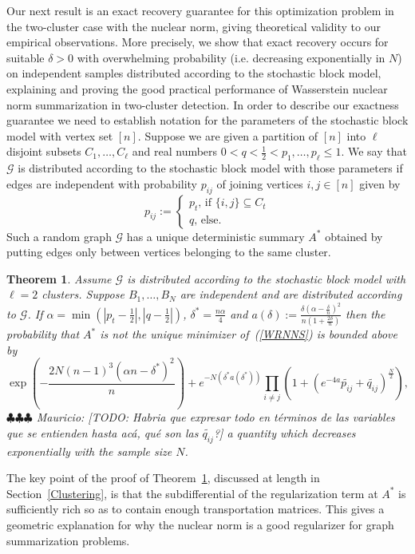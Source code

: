 \documentclass[12pt]{amsart}
\newtheorem{theorem}[lemma]{Theorem}
\theoremstyle{remark}
\newcommand{\grG}{{\mathcal{G}}}
\newcommand{\mv}[1]{{\color{red} \sf $\clubsuit\clubsuit\clubsuit$ Mauricio: [#1]}}
\begin{document}
Our next result is an exact recovery guarantee for this optimization problem in the two-cluster case with the nuclear norm, giving theoretical validity to our empirical observations. More precisely, we show that exact recovery occurs for suitable $\delta>0$ with overwhelming probability (i.e. decreasing exponentially in $N$) on independent samples distributed according to the stochastic block model, explaining and proving the good practical performance of Wasserstein nuclear norm summarization in two-cluster detection. In order to describe our exactness guarantee we need to establish notation for the parameters of the stochastic block model with vertex set $[n]$. Suppose we are given a partition of $[n]$ into $\ell$ disjoint subsets $C_1,\dots, C_\ell$ and real numbers $0< q<\frac{1}{2}<p_1,\dots, p_\ell\leq 1$. We say that $\grG$ is distributed according to the stochastic block model with those parameters if edges are independent with probability $p_{ij}$ of joining vertices $i,j\in [n]$ given by
\[p_{ij}:=\begin{cases}
p_t\text{, if $\{i,j\}\subseteq C_t$}\\
q\text{, else.}
\end{cases}
\]
Such a random graph $\grG$ has a unique deterministic summary $A^*$ obtained by putting edges only between vertices belonging to the same cluster.

\begin{theorem}\label{thm. performance} Assume $\grG$ is distributed according to the stochastic block model with $\ell=2$ clusters. Suppose $B_1,\dots, B_N$ are independent and are distributed according to $\grG$. If $\alpha = \min (|p_t-\frac{1}{2}|, |q-\frac{1}{2}|)$, $\delta^*=\frac{n\alpha}{4}$ and $a(\delta):=\frac{\delta\left(\alpha-\frac{\delta}{n}\right)^2}{n\left(1+\frac{2\delta}{n}\right)}$ then the probability that $A^*$ is not the unique minimizer of~(\ref{WRNNS}) is bounded above by
\[ \exp\left(-\frac{2N(n-1)^3(\alpha n-\delta^*)^2}{n}\right) + e^{-N\left(\delta^* a(\delta^*)\right)}\prod_{i\neq j}\left(1+ (e^{-4a}\widetilde{p_{ij}}+\widetilde{q_{ij}})^{\frac{N}{2}}\right),\] 
\mv{TODO: Habria que expresar todo en t\'erminos de las variables que se entienden hasta ac\'a, qu\'e son las $\widetilde{q_{ij}}$?}
a quantity which decreases exponentially with the sample size $N$.
\end{theorem}

The key point of the proof of Theorem~\ref{thm. performance}, discussed at length in Section~\ref{Clustering}, is that the subdifferential of the regularization term at $A^*$ is sufficiently rich so as to contain enough transportation matrices. This gives a geometric explanation for why the nuclear norm is a good regularizer for graph summarization problems.
\end{document}
